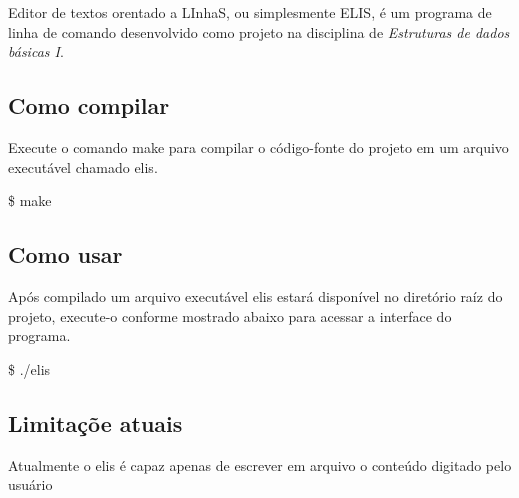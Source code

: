Editor de textos orentado a L\-Inha\-S, ou simplesmente E\-L\-I\-S, é um programa de linha de comando desenvolvido como projeto na disciplina de {\itshape Estruturas de dados básicas I}.

\subsection*{Como compilar}

Execute o comando {\ttfamily make} para compilar o código-\/fonte do projeto em um arquivo executável chamado {\ttfamily elis}.

\$ make

\subsection*{Como usar}

Após compilado um arquivo executável {\ttfamily elis} estará disponível no diretório raíz do projeto, execute-\/o conforme mostrado abaixo para acessar a interface do programa.

\$ ./elis

\subsection*{Limitaçõe atuais}

Atualmente o {\ttfamily elis} é capaz apenas de escrever em arquivo o conteúdo digitado pelo usuário 